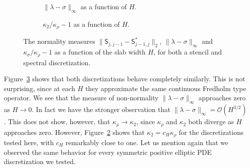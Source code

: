 \documentclass[final,onefignum,onetabnum]{siamart250211}
\newcommand{\vct}[1]{\bm{\mathsf{#1}}}
\newcommand{\mtx}[1]{\bm{\mathsf{#1}}}
\theoremstyle{definition}
\begin{document}
\begin{figure}[H]
\begin{subfigure}[t]{.32\linewidth}
    \caption{$\|\vct{\lambda}-\vct{\sigma}\|_{\infty}$ as a function of $H$.}
    \label{fig:eigSvdH}
    \end{subfigure}
    \hfill
\begin{subfigure}[t]{.32\linewidth}
    \centering
    \caption{$\kappa_2/\kappa_{\rho}-1$ as a function of $H$.}
    \label{fig:kappaSvdEig}
    \end{subfigure}  
\caption{The normality measures $\|\mtx{S}_{j,j-1}-\mtx{S}_{j-1,j}^*\|_{2}$, $\|\vct{\lambda}-\vct{\sigma}\|_{\infty}$ and $\kappa_{\sigma}/\kappa_\rho-1$ as a function of the slab width $H$, for both a stencil and spectral discretization.}
\label{fig:normalFigAsymptotic}
\end{figure}
Figure~\ref{fig:normalFigAsymptotic} shows that both discretizations behave completely similarly. This is not surprising, since at each $H$ they approximate the same continuous Fredholm type operator. We see that the measure of non-normality $\|\vct{\lambda}-\vct{\sigma}\|_{\infty}$ approaches zero as $H\rightarrow 0$. In fact we have the stronger observation that $\|\vct{\lambda}-\vct{\sigma}\|_{\infty}=\mathcal{O}(H^{3/2})$. This does not show, however, that $\kappa_{\rho}\rightarrow \kappa_2$, since $\kappa_\rho$ and $\kappa_2$ both diverge as $H$ approaches zero. However, Figure~\ref{fig:kappaSvdEig} shows that $\kappa_2=c_H\kappa_{\rho}$ for the discretizations tested here, with $c_H$ remarkably close to one. Let us mention again that we observed the same behavior for every symmetric positive elliptic PDE discretization we tested.
\end{document}
